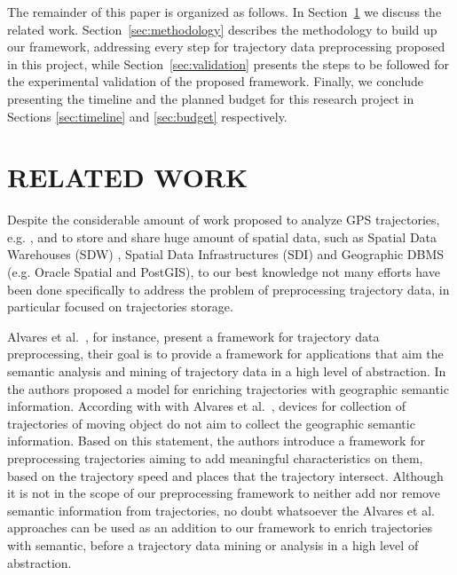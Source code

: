 \documentclass[a4paper,12pt]{article}
\begin{document}
The remainder of this paper is organized as follows. In Section~\ref{sec:relatedwork} we discuss the related work. Section~\ref{sec:methodology} describes the methodology to build up our framework, addressing every step for trajectory data preprocessing proposed in this project, while Section~\ref{sec:validation} presents the steps to be followed for the experimental validation of the proposed framework. Finally, we conclude presenting the timeline and the planned budget for this research project in Sections \ref{sec:timeline} and \ref{sec:budget} respectively. 
 
\section{RELATED WORK}\label{sec:relatedwork}
Despite the considerable amount of work proposed to analyze GPS trajectories, e.g. \cite{chen2011}\cite{gudmundsson2012}\cite{yuan2010}\cite{zheng2008}\cite{zheng2009}, and to store and share huge amount of spatial data, such as Spatial Data Warehouses (SDW) \cite{barclay2000}, Spatial Data Infrastructures (SDI) \cite{oxford2000}\cite{rajabifard1999} and Geographic DBMS (e.g. Oracle Spatial and PostGIS), to our best knowledge not many efforts have been done specifically to address the problem of preprocessing trajectory data, in particular focused on trajectories storage.

Alvares et al.~\cite{alvares2009}, for instance, present a framework for trajectory data preprocessing, their goal is to provide a framework for applications that aim the semantic analysis and mining of trajectory data in a high level of abstraction. In \cite{alvares2007} the authors proposed a model for enriching trajectories with geographic semantic information. According with with Alvares et al.~\cite{alvares2007}, devices for collection of trajectories of moving object do not aim to collect the geographic semantic information. Based on this statement, the authors introduce a framework for preprocessing trajectories aiming to add meaningful characteristics on them, based on the trajectory speed and places that the trajectory intersect. Although it is not in the scope of our preprocessing framework to neither add nor remove semantic information from trajectories, no doubt whatsoever the Alvares et al.~\cite{alvares2007}\cite{alvares2009} approaches can be used as an addition to our framework to enrich trajectories with semantic, before a trajectory data mining or analysis in a high level of abstraction. 
\end{document}

